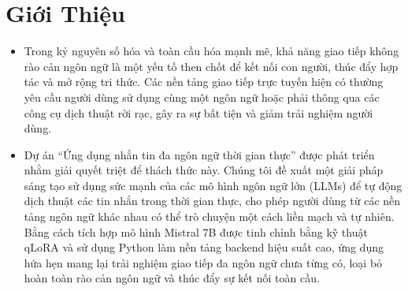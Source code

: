 \section{Giới Thiệu}
\begin{itemize}
    \item Trong kỷ nguyên số hóa và toàn cầu hóa mạnh mẽ, khả năng giao tiếp không rào cản ngôn ngữ là một yếu tố then chốt để kết nối con người, thúc đẩy hợp tác và mở rộng tri thức. Các nền tảng giao tiếp trực tuyến hiện có thường yêu cầu người dùng sử dụng cùng một ngôn ngữ hoặc phải thông qua các công cụ dịch thuật rời rạc, gây ra sự bất tiện và giảm trải nghiệm người dùng.
    \item Dự án ``Ứng dụng nhắn tin đa ngôn ngữ thời gian thực'' được phát triển nhằm giải quyết triệt để thách thức này. Chúng tôi đề xuất một giải pháp sáng tạo sử dụng sức mạnh của các mô hình ngôn ngữ lớn (LLMs) để tự động dịch thuật các tin nhắn trong thời gian thực, cho phép người dùng từ các nền tảng ngôn ngữ khác nhau có thể trò chuyện một cách liền mạch và tự nhiên. Bằng cách tích hợp mô hình Mistral 7B được tinh chỉnh bằng kỹ thuật qLoRA và sử dụng Python làm nền tảng backend hiệu suất cao, ứng dụng hứa hẹn mang lại trải nghiệm giao tiếp đa ngôn ngữ chưa từng có, loại bỏ hoàn toàn rào cản ngôn ngữ và thúc đẩy sự kết nối toàn cầu.
\end{itemize}

